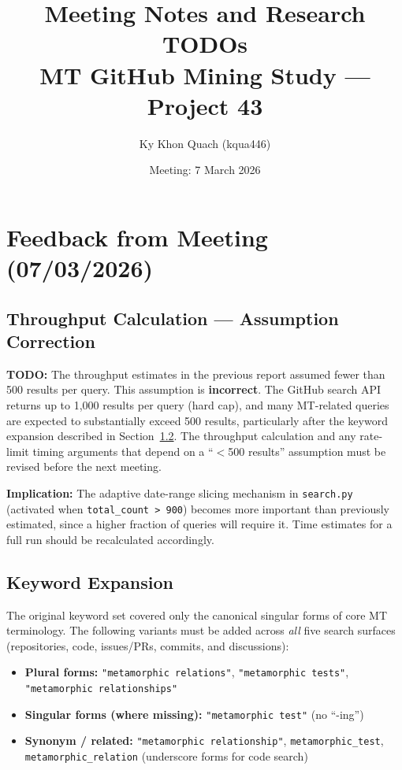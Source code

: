\documentclass[12pt,a4paper]{article}
\title{Meeting Notes and Research TODOs\\
       \large MT GitHub Mining Study --- Project 43}
\author{Ky Khon Quach (kqua446)}
\date{Meeting: 7 March 2026}
\newenvironment{todo}{\begin{mdframed}[linecolor=todocolor,linewidth=1pt]\textbf{\color{todocolor}TODO: }}{\end{mdframed}}
\begin{document}
\maketitle
\tableofcontents
\newpage

\section{Feedback from Meeting (07/03/2026)}

\subsection{Throughput Calculation --- Assumption Correction}

\begin{todo}
The throughput estimates in the previous report assumed fewer than 500 results
per query. This assumption is \textbf{incorrect}. The GitHub search API returns
up to 1,000 results per query (hard cap), and many MT-related queries are
expected to substantially exceed 500 results, particularly after the keyword
expansion described in Section~\ref{sec:keywords}. The throughput calculation
and any rate-limit timing arguments that depend on a ``$<$500 results''
assumption must be revised before the next meeting.
\end{todo}

\noindent
\textbf{Implication:} The adaptive date-range slicing mechanism in
\texttt{search.py} (activated when \texttt{total\_count > 900}) becomes more
important than previously estimated, since a higher fraction of queries will
require it. Time estimates for a full run should be recalculated accordingly.

\subsection{Keyword Expansion}
\label{sec:keywords}

The original keyword set covered only the canonical singular forms of core MT
terminology. The following variants must be added across \emph{all} five search
surfaces (repositories, code, issues/PRs, commits, and discussions):

\begin{itemize}
  \item \textbf{Plural forms:}
    \texttt{"metamorphic relations"}, \texttt{"metamorphic tests"},
    \texttt{"metamorphic relationships"}
  \item \textbf{Singular forms (where missing):}
    \texttt{"metamorphic test"} (no ``-ing'')
  \item \textbf{Synonym / related:}
    \texttt{"metamorphic relationship"}, \texttt{metamorphic\_test},
    \texttt{metamorphic\_relation} (underscore forms for code search)
\end{itemize}
\end{document}
